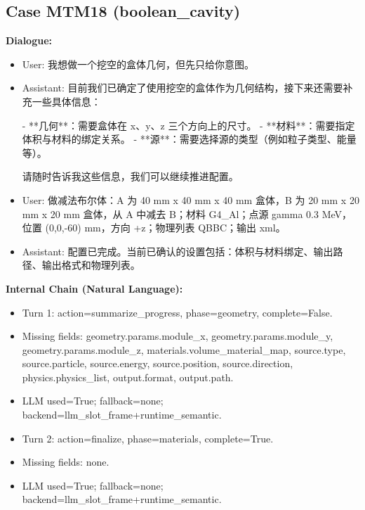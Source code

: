 \documentclass[11pt]{ctexart}
\begin{document}
\subsection{Case MTM18 (boolean\_cavity)}
\textbf{Dialogue:}
\begin{itemize}
\item User: 我想做一个挖空的盒体几何，但先只给你意图。
\item Assistant: 目前我们已确定了使用挖空的盒体作为几何结构，接下来还需要补充一些具体信息：

- **几何**：需要盒体在 x、y、z 三个方向上的尺寸。
- **材料**：需要指定体积与材料的绑定关系。
- **源**：需要选择源的类型（例如粒子类型、能量等）。

请随时告诉我这些信息，我们可以继续推进配置。
\item User: 做减法布尔体：A 为 40 mm x 40 mm x 40 mm 盒体，B 为 20 mm x 20 mm x 20 mm 盒体，从 A 中减去 B；材料 G4\_Al；点源 gamma 0.3 MeV，位置 (0,0,-60) mm，方向 +z；物理列表 QBBC；输出 xml。
\item Assistant: 配置已完成。当前已确认的设置包括：体积与材料绑定、输出路径、输出格式和物理列表。
\end{itemize}
\textbf{Internal Chain (Natural Language):}
\begin{itemize}
\item Turn 1: action=summarize\_progress, phase=geometry, complete=False.
\item Missing fields: geometry.params.module\_x, geometry.params.module\_y, geometry.params.module\_z, materials.volume\_material\_map, source.type, source.particle, source.energy, source.position, source.direction, physics.physics\_list, output.format, output.path.
\item LLM used=True; fallback=none; backend=llm\_slot\_frame+runtime\_semantic.
\item Turn 2: action=finalize, phase=materials, complete=True.
\item Missing fields: none.
\item LLM used=True; fallback=none; backend=llm\_slot\_frame+runtime\_semantic.
\end{itemize}
\end{document}
